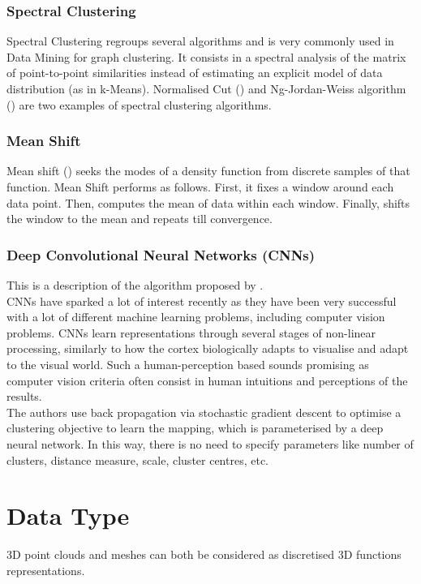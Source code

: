 \documentclass{kththesis}
\begin{document}
\subsubsection{Spectral Clustering}
Spectral Clustering regroups several algorithms and is very commonly used in Data Mining for graph clustering. It consists in a spectral analysis of the matrix of point-to-point similarities instead of estimating an explicit model of data distribution (as in k-Means). Normalised Cut (\textcite{SpectralShiMalik}) and  Ng-Jordan-Weiss algorithm (\textcite{SpectralNg}) are two examples of spectral clustering algorithms. 
\subsubsection{Mean Shift}
Mean shift (\textcite{meanshift}) seeks the modes of a density function from
discrete samples of that function. Mean Shift performs as follows. First, it fixes a window around
each data point. Then, computes the mean of data within each window. Finally, shifts the window
to the mean and repeats till convergence.
\subsubsection{Deep Convolutional Neural Networks (CNNs) }
This is a description of the algorithm proposed by \textcite{ClusteringTechniques}. \\
CNNs have sparked a lot of interest recently as they have been very successful with a lot of different machine learning problems, including computer vision problems. CNNs learn representations through several stages of non-linear processing, similarly to how the cortex biologically adapts to visualise and adapt to the visual world. Such a human-perception based sounds promising as computer vision criteria often consist in human intuitions and perceptions of the results. \\
The authors use back propagation via stochastic
gradient descent to optimise a clustering objective to learn the mapping, which is parameterised by
a deep neural network. In this way, there is no need to specify parameters like number of clusters,
distance measure, scale, cluster centres, etc.




\section{Data Type}
3D point clouds and meshes can both be considered as discretised 3D functions representations. 
\end{document}
